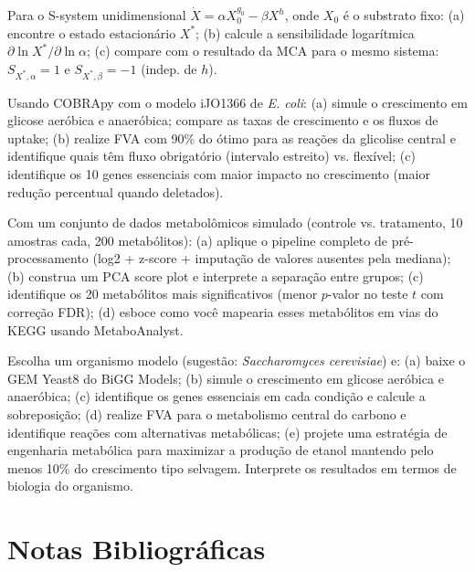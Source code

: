 \begin{exercicio}[S-systems]
Para o S-system unidimensional $\dot{X} = \alpha X_0^{g_0} - \beta X^h$, onde $X_0$ é o
substrato fixo: (a) encontre o estado estacionário $X^*$; (b) calcule a sensibilidade
logarítmica $\partial \ln X^* / \partial \ln \alpha$; (c) compare com o resultado da MCA
para o mesmo sistema: $S_{X^*, \alpha} = 1$ e $S_{X^*, \beta} = -1$ (indep. de $h$).
\end{exercicio}

\begin{exercicio}[COBRApy]
Usando COBRApy com o modelo iJO1366 de \textit{E. coli}: (a) simule o crescimento em
glicose aeróbica e anaeróbica; compare as taxas de crescimento e os fluxos de uptake;
(b) realize FVA com 90\% do ótimo para as reações da glicolise central e identifique
quais têm fluxo obrigatório (intervalo estreito) vs. flexível; (c) identifique os 10 genes
essenciais com maior impacto no crescimento (maior redução percentual quando deletados).
\end{exercicio}

\begin{exercicio}[Metabolômica]
Com um conjunto de dados metabolômicos simulado (controle vs. tratamento, 10 amostras
cada, 200 metabólitos): (a) aplique o pipeline completo de pré-processamento (log2 +
z-score + imputação de valores ausentes pela mediana); (b) construa um PCA score plot e
interprete a separação entre grupos; (c) identifique os 20 metabólitos mais significativos
(menor $p$-valor no teste $t$ com correção FDR); (d) esboce como você mapearia esses
metabólitos em vias do KEGG usando MetaboAnalyst.
\end{exercicio}

\begin{exercicio}
Escolha um organismo modelo (sugestão: \textit{Saccharomyces cerevisiae}) e: (a) baixe
o GEM Yeast8 do BiGG Models; (b) simule o crescimento em glicose aeróbica e anaeróbica;
(c) identifique os genes essenciais em cada condição e calcule a sobreposição; (d) realize
FVA para o metabolismo central do carbono e identifique reações com alternativas metabólicas;
(e) projete uma estratégia de engenharia metabólica para maximizar a produção de etanol
mantendo pelo menos 10\% do crescimento tipo selvagem. Interprete os resultados em termos
de biologia do organismo.
\end{exercicio}

\section{Notas Bibliográficas}

